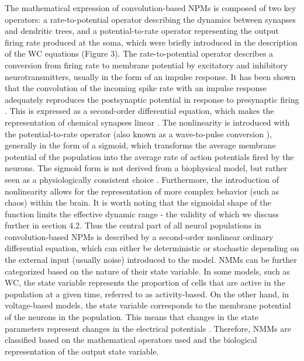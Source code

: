 \documentclass[12pt,twoside]{article}
\begin{document}
The mathematical expression of convolution-based NPMs is composed of two key operators: a rate-to-potential operator describing the dynamics between synapses and dendritic trees, and a potential-to-rate operator representing the output firing rate produced at the soma, which were briefly introduced in the description of the WC equations (Figure 3). The rate-to-potential operator describes a conversion from firing rate to membrane potential by excitatory and inhibitory neurotransmitters, usually in the form of an impulse response. It has been shown that the convolution of the incoming spike rate with an impulse response adequately reproduces the postsynaptic potential in response to presynaptic firing \citep{bhattacharya2013implementing}. This is expressed as a second-order differential equation, which makes the representation of chemical synapses linear \citep{rall1962electrophysiology, rall1964theoretical, freeman1975mass,spiegler2012dynamics}. The nonlinearity is introduced with the potential-to-rate operator (also known as a wave-to-pulse conversion \citep{freeman1992tutorial, cook2021neural}), generally in the form of a sigmoid, which transforms the average membrane potential of the population into the average rate of action potentials fired by the neurons. The sigmoid form is not derived from a biophysical model, but rather seen as a physiologically consistent choice \citep{coombes2019next}. Furthermore, the introduction of nonlinearity allows for the representation of more complex behavior (such as chaos) within the brain. It is worth noting that the sigmoidal shape of the function limits the effective dynamic range \citep{spiegler2012dynamics} - the validity of which we discuss further in section 4.2.
Thus the central part of all neural populations in convolution-based NPMs is described by a second-order nonlinear ordinary differential equation, which can either be deterministic or stochastic depending on the external input (usually noise) introduced to the model. NMMs can be further categorized based on the nature of their state variable. In some models, such as WC, the state variable represents the proportion of cells that are active in the population at a given time, referred to as activity-based. On the other hand, in voltage-based models, the state variable corresponds to the membrane potential of the neurons in the population. This means that changes in the state parameters represent changes in the electrical potentials \citep{griffiths2022whole}. Therefore, NMMs are classified based on the mathematical operators used and the biological representation of the output state variable.
\end{document}
